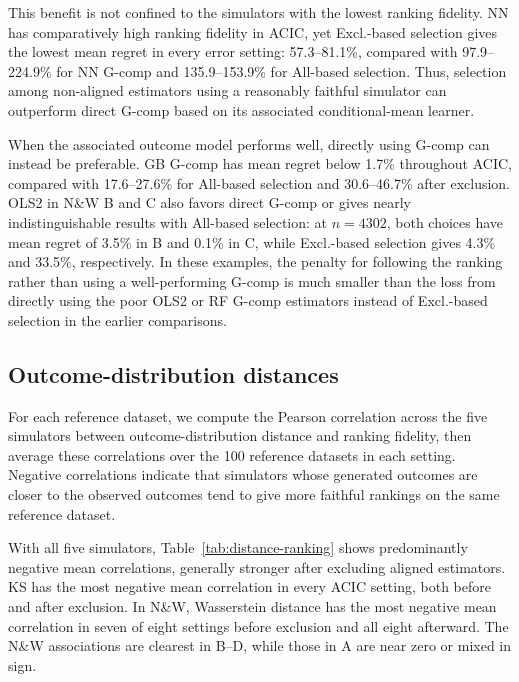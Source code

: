 This benefit is not confined to the simulators with the lowest ranking fidelity. NN has comparatively high ranking fidelity in ACIC, yet Excl.-based selection gives the lowest mean regret in every error setting: 57.3--81.1\%, compared with 97.9--224.9\% for NN G-comp and 135.9--153.9\% for All-based selection. Thus, selection among non-aligned estimators using a reasonably faithful simulator can outperform direct G-comp based on its associated conditional-mean learner.

When the associated outcome model performs well, directly using G-comp can instead be preferable. GB G-comp has mean regret below 1.7\% throughout ACIC, compared with 17.6--27.6\% for All-based selection and 30.6--46.7\% after exclusion. OLS2 in N\&W B and C also favors direct G-comp or gives nearly indistinguishable results with All-based selection: at \(n=4302\), both choices have mean regret of 3.5\% in B and 0.1\% in C, while Excl.-based selection gives 4.3\% and 33.5\%, respectively. In these examples, the penalty for following the ranking rather than using a well-performing G-comp is much smaller than the loss from directly using the poor OLS2 or RF G-comp estimators instead of Excl.-based selection in the earlier comparisons.

\subsection{Outcome-distribution distances}



For each reference dataset, we compute the Pearson correlation across the five simulators between outcome-distribution distance and ranking fidelity, then average these correlations over the 100 reference datasets in each setting. Negative correlations indicate that simulators whose generated outcomes are closer to the observed outcomes tend to give more faithful rankings on the same reference dataset.

With all five simulators, Table~\ref{tab:distance-ranking} shows predominantly negative mean correlations, generally stronger after excluding aligned estimators. KS has the most negative mean correlation in every ACIC setting, both before and after exclusion. In N\&W, Wasserstein distance has the most negative mean correlation in seven of eight settings before exclusion and all eight afterward. The N\&W associations are clearest in B--D, while those in A are near zero or mixed in sign.

